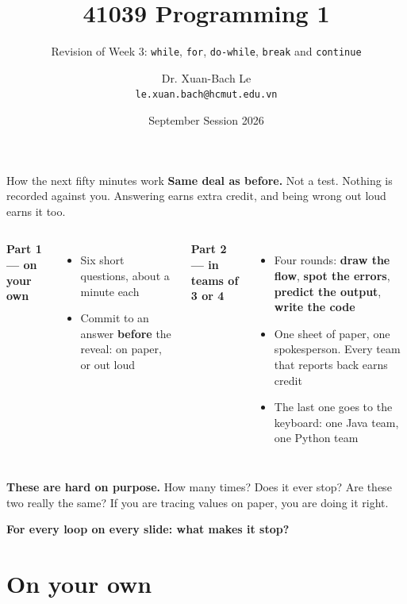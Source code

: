 \documentclass[aspectratio=169]{beamer}
\title[41039 Programming 1 --- Revision of Week 3]{41039 Programming 1}
\subtitle{Revision of Week 3: \texttt{while}, \texttt{for}, \texttt{do-while}, \texttt{break} and \texttt{continue}}
\author{Dr. Xuan-Bach Le\\ \small\texttt{le.xuan.bach@hcmut.edu.vn}}
\institute{\small Faculty of Computer Science and Engineering, HCMUT}
\date{September Session 2026}
\newcommand{\keyline}[1]{\vfill\begin{center}\textcolor{bkblue}{\textbf{#1}}\end{center}\vspace*{0.2em}}
\newcommand{\hd}[1]{\textbf{#1}}
\newcommand{\neutrallabel}[1]{\textcolor{bkblue}{\textbf{#1}}}
\begin{document}
\begin{frame}[plain]
  \titlepage
\end{frame}

\begin{frame}{How the next fifty minutes work}
  \hd{Same deal as before.} Not a test. Nothing is recorded against you. Answering earns
  extra credit, and being wrong out loud earns it too.
  \vspace{0.5em}
  \begin{columns}[T,onlytextwidth]
    \neutrallabel{Part 1 --- on your own}
    \begin{itemize}[itemsep=0.2em]
      \small
      \item Six short questions, about a minute each
      \item Commit to an answer \textbf{before} the reveal: on paper, or out loud
    \end{itemize}
    \neutrallabel{Part 2 --- in teams of 3 or 4}
    \begin{itemize}[itemsep=0.2em]
      \small
      \item Four rounds: \textbf{draw the flow}, \textbf{spot the errors},
        \textbf{predict the output}, \textbf{write the code}
      \item One sheet of paper, one spokesperson. Every team that reports back earns credit
      \item The last one goes to the keyboard: one Java team, one Python team
    \end{itemize}
  \end{columns}
  \vspace{0.4em}
  \hd{These are hard on purpose.} How many times? Does it ever stop? Are these two really
  the same? If you are tracing values on paper, you are doing it right.
  \keyline{For every loop on every slide: what makes it stop?}
\end{frame}

\section{On your own}
\end{document}
